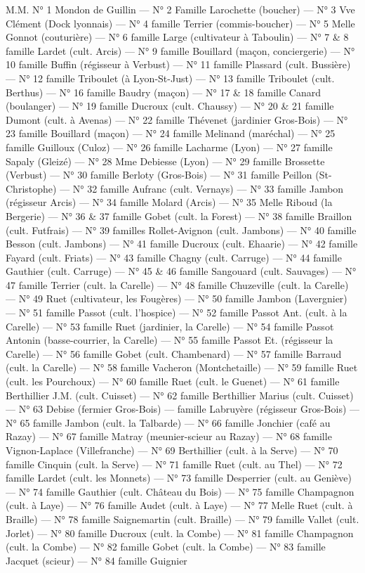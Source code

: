 \documentclass[11pt,a4paper]{report}
\begin{document}
\begin{small}
M.M. N° 1 Mondon de Guillin — N° 2 Famille Larochette (boucher) — N° 3 Vve Clément (Dock lyonnais) — N° 4 famille Terrier (commis-boucher) — N° 5 Melle Gonnot (couturière) — N° 6 famille Large (cultivateur à Taboulin) — N° 7 \& 8 famille Lardet (cult. Arcis) — N° 9 famille Bouillard (maçon, conciergerie) — N° 10 famille Buffin (régisseur à Verbust) — N° 11 famille Plassard (cult. Bussière) — N° 12 famille Triboulet (à Lyon-St-Just) — N° 13 famille Triboulet (cult. Berthus) — N° 16 famille Baudry (maçon) — N° 17 \& 18 famille Canard (boulanger) — N° 19 famille Ducroux (cult. Chaussy) — N° 20 \& 21 famille Dumont (cult. à Avenas) — N° 22 famille Thévenet (jardinier Gros-Bois) — N° 23 famille Bouillard (maçon) — N° 24 famille Melinand (maréchal) — N° 25 famille Guilloux (Culoz) — N° 26 famille Lacharme (Lyon) — N° 27 famille Sapaly (Gleizé) — N° 28 Mme Debiesse (Lyon) — N° 29 famille Brossette (Verbust) — N° 30 famille Berloty (Gros-Bois) — N° 31 famille Peillon (St-Christophe) — N° 32 famille Aufranc (cult. Vernays) — N° 33 famille Jambon (régisseur Arcis) — N° 34 famille Molard (Arcis) — N° 35 Melle Riboud (la Bergerie) — N° 36 \& 37 famille Gobet (cult. la Forest) — N° 38 famille Braillon (cult. Futfrais) — N° 39 familles Rollet-Avignon (cult. Jambons) — N° 40 famille Besson (cult. Jambons) — N° 41 famille Ducroux (cult. Ehaarie) — N° 42 famille Fayard (cult. Friats) — N° 43 famille Chagny (cult. Carruge) — N° 44 famille Gauthier (cult. Carruge) — N° 45 \& 46 famille Sangouard (cult. Sauvages) — N° 47 famille Terrier (cult. la Carelle) — N° 48 famille Chuzeville (cult. la Carelle) — N° 49 Ruet (cultivateur, les Fougères) — N° 50 famille Jambon (Lavergnier) — N° 51 famille Passot (cult. l'hospice) — N° 52 famille Passot Ant. (cult. à la Carelle) — N° 53 famille Ruet (jardinier, la Carelle) — N° 54 famille Passot Antonin (basse-courrier, la Carelle) — N° 55 famille Passot Et. (régisseur la Carelle) — N° 56 famille Gobet (cult. Chambenard) — N° 57 famille Barraud (cult. la Carelle) — N° 58 famille Vacheron (Montchetaille) — N° 59 famille Ruet (cult. les Pourchoux) — N° 60 famille Ruet (cult. le Guenet) — N° 61 famille Berthillier J.M. (cult. Cuisset) — N° 62 famille Berthillier Marius (cult. Cuisset) — N° 63 Debise (fermier Gros-Bois) — famille Labruyère (régisseur Gros-Bois) — N° 65 famille Jambon (cult. la Talbarde) — N° 66 famille Jonchier (café au Razay) — N° 67 famille Matray (meunier-scieur au Razay) — N° 68 famille Vignon-Laplace (Villefranche) — N° 69 Berthillier (cult. à la Serve) — N° 70 famille Cinquin (cult. la Serve) — N° 71 famille Ruet (cult. au Thel) — N° 72 famille Lardet (cult. les Monnets) — N° 73 famille Desperrier (cult. au Geniève) — N° 74 famille Gauthier (cult. Château du Bois) — N° 75 famille Champagnon (cult. à Laye) — N° 76 famille Audet (cult. à Laye) — N° 77 Melle Ruet (cult. à Braille) — N° 78 famille Saignemartin (cult. Braille) — N° 79 famille Vallet (cult. Jorlet) — N° 80 famille Ducroux (cult. la Combe) — N° 81 famille Champagnon (cult. la Combe) — N° 82 famille Gobet (cult. la Combe) — N° 83 famille Jacquet (scieur) — N° 84 famille Guignier 
\end{small}
\end{document}
